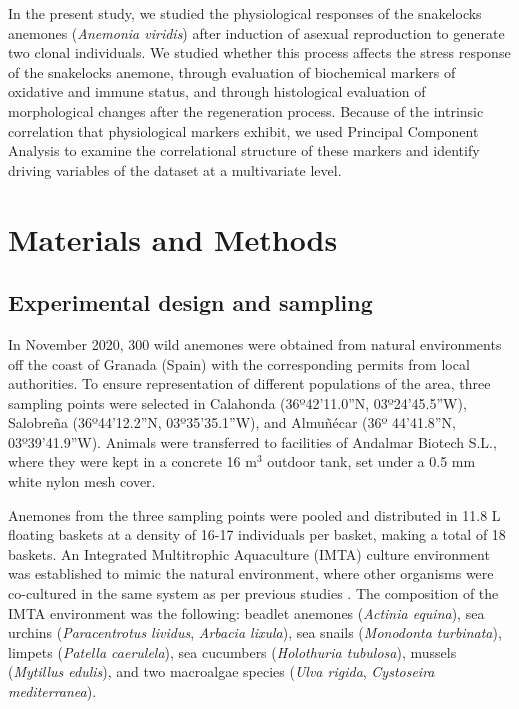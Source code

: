 \documentclass[final,3p,times,authoryear]{elsarticle}
\begin{document}
In the present study, we studied the physiological responses of the snakelocks anemones (\textit{Anemonia viridis}) after induction of asexual reproduction to generate two clonal individuals. We studied whether this process affects the stress response of the snakelocks anemone, through evaluation of biochemical markers of oxidative and immune status, and through histological evaluation of morphological changes after the regeneration process. Because of the intrinsic correlation that physiological markers exhibit, we used Principal Component Analysis to examine the correlational structure of these markers and identify driving variables of the dataset at a multivariate level.


\section{Materials and Methods}
\label{sec2}

\subsection{Experimental design and sampling}
\label{subsec1}

In November 2020, 300 wild anemones were obtained from natural environments off the coast of Granada (Spain) with the corresponding permits from local authorities. To ensure representation of different populations of the area, three sampling points were selected in Calahonda (36º42’11.0”N, 03º24’45.5”W), Salobreña (36º44’12.2”N, 03º35’35.1”W), and Almuñécar (36º 44’41.8”N, 03º39’41.9”W). Animals were transferred to facilities of Andalmar Biotech S.L., where they were kept in a concrete 16 m$^3$ outdoor tank, set under a 0.5 mm white nylon mesh cover. 

Anemones from the three sampling points were pooled and distributed in 11.8 L floating baskets at a density of 16-17 individuals per basket, making a total of 18 baskets. An Integrated Multitrophic Aquaculture (IMTA) culture environment was established to mimic the natural environment, where other organisms were co-cultured in the same system as per previous studies \citep{Coll2025}. The composition of the IMTA environment was the following: beadlet anemones (\textit{Actinia equina}), sea urchins (\textit{Paracentrotus lividus}, \textit{Arbacia lixula}), sea snails (\textit{Monodonta turbinata}), limpets (\textit{Patella caerulela}), sea cucumbers (\textit{Holothuria tubulosa}), mussels (\textit{Mytillus edulis}), and two macroalgae species (\textit{Ulva rigida}, \textit{Cystoseira mediterranea}).
\end{document}
